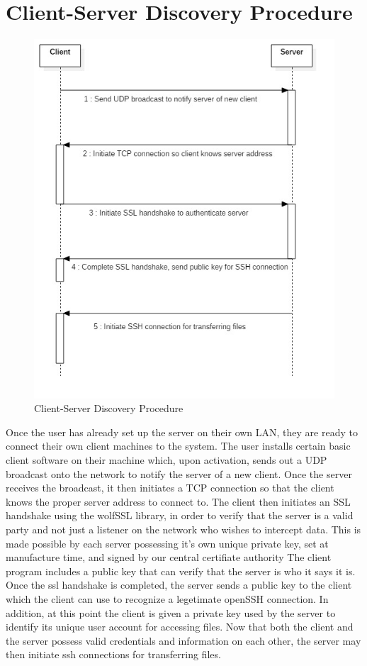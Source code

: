 \section{Client-Server Discovery Procedure}
\begin{figure}
\centering
\includegraphics[scale=0.5]{images/SequenceDiagram1.jpg}
\caption{Client-Server Discovery Procedure}
\label{fig:connect}
\end{figure}

Once the user has already set up the server on their own LAN, they are ready to connect their own client machines to the system.  The user installs certain basic client software on their machine which, upon activation, sends out a UDP broadcast onto the network to notify the server of a new client.  Once the server receives the broadcast, it then initiates a TCP connection so that the client knows the proper server address to connect to.  The client then initiates an SSL handshake using the wolfSSL library, in order to verify that the server is a valid party and not just a listener on the network who wishes to intercept data.  This is made possible by each server possessing it's own unique private key, set at manufacture time, and signed by our central certifiate authority  The client program includes a public key that can verify that the server is who it says it is.  Once the ssl handshake is completed, the server sends a public key to the client which the client can use to recognize a legetimate openSSH connection.  In addition, at this point the client is given a private key used by the server to identify its unique user account for accessing files.  Now that both the client and the server possess valid credentials and information on each other, the server may then initiate ssh connections for transferring files.

